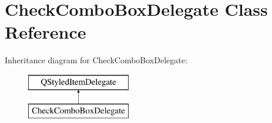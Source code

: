 \hypertarget{class_check_combo_box_delegate}{\section{Check\-Combo\-Box\-Delegate Class Reference}
\label{class_check_combo_box_delegate}
}
Inheritance diagram for Check\-Combo\-Box\-Delegate\-:\begin{figure}[H]
\begin{center}
\leavevmode
\includegraphics[height=2.000000cm]{class_check_combo_box_delegate}
\end{center}
\end{figure}
